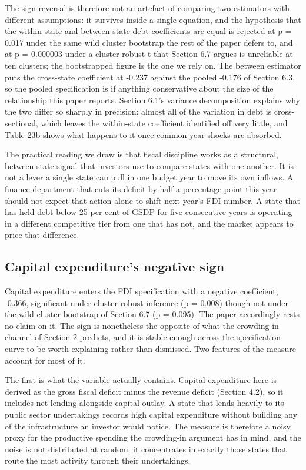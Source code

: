 \documentclass[12pt,a4paper]{article}
\begin{document}
The sign reversal is therefore not an artefact of comparing two estimators with different assumptions: it survives inside a single equation, and the hypothesis that the within-state and between-state debt coefficients are equal is rejected at p = 0.017 under the same wild cluster bootstrap the rest of the paper defers to, and at p = 0.000003 under a cluster-robust t that Section 6.7 argues is unreliable at ten clusters; the bootstrapped figure is the one we rely on. The between estimator puts the cross-state coefficient at -0.237 against the pooled -0.176 of Section 6.3, so the pooled specification is if anything conservative about the size of the relationship this paper reports. Section 6.1's variance decomposition explains why the two differ so sharply in precision: almost all of the variation in debt is cross-sectional, which leaves the within-state coefficient identified off very little, and Table 23b shows what happens to it once common year shocks are absorbed.

The practical reading we draw is that fiscal discipline works as a structural, between-state signal that investors use to compare states with one another. It is not a lever a single state can pull in one budget year to move its own inflows. A finance department that cuts its deficit by half a percentage point this year should not expect that action alone to shift next year's FDI number. A state that has held debt below 25 per cent of GSDP for five consecutive years is operating in a different competitive tier from one that has not, and the market appears to price that difference.

\subsection{Capital expenditure's negative sign}

Capital expenditure enters the FDI specification with a negative coefficient, -0.366, significant under cluster-robust inference (p = 0.008) though not under the wild cluster bootstrap of Section 6.7 (p = 0.095). The paper accordingly rests no claim on it. The sign is nonetheless the opposite of what the crowding-in channel of Section 2 predicts, and it is stable enough across the specification curve to be worth explaining rather than dismissed. Two features of the measure account for most of it.

The first is what the variable actually contains. Capital expenditure here is derived as the gross fiscal deficit minus the revenue deficit (Section 4.2), so it includes net lending alongside capital outlay. A state that lends heavily to its public sector undertakings records high capital expenditure without building any of the infrastructure an investor would notice. The measure is therefore a noisy proxy for the productive spending the crowding-in argument has in mind, and the noise is not distributed at random: it concentrates in exactly those states that route the most activity through their undertakings.
\end{document}
